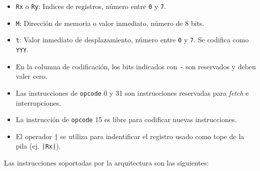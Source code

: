 \documentclass[a4paper,11pt]{article}
\begin{document}
\small
\begin{itemize}
 \setlength\itemsep{0em}
 \item \texttt{Rx} o \texttt{Ry}: Indices de registros, número entre \texttt{0} y \texttt{7}.
 \item \texttt{M}: Dirección de memoria o valor inmediato, número de 8 bits.
 \item \texttt{t}: Valor inmediato de desplazamiento, número entre \texttt{0} y \texttt{7}. Se codifica como \texttt{YYY}.
 \item En la columna de codificación, los bits indicados con \texttt{-} son reservados y deben valer cero.
 \item Las instrucciones de \texttt{opcode} 0 y 31 son instrucciones reservadas para \emph{fetch} e interrupciones.
 \item La instrucción de \texttt{opcode} 15 es libre para codificar nuevas instrucciones.
 \item El operador \texttt{|} se utiliza para indentificar el registro usado como tope de la pila (ej. \texttt{|Rx|}).
\end{itemize}
\normalsize

\noindent Las instrucciones soportadas por la arquitectura son las siguientes:
\end{document}
